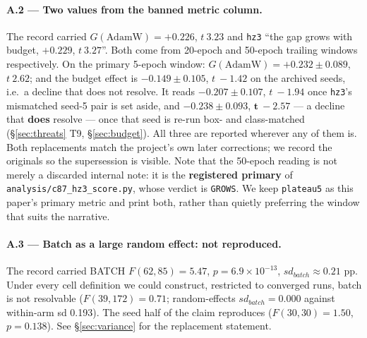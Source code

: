\documentclass[10pt,letterpaper]{article}
\newcommand{\Gstat}{G}                         %
\newcommand{\plateau}{\texttt{plateau5}}
\newcommand{\arm}[1]{\texttt{#1}}
\begin{document}
\paragraph{A.2 --- Two values from the banned metric column.}
The record carried $\Gstat(\text{AdamW}) = +0.226$, $t\ 3.23$ and \arm{hz3} ``the gap grows with
budget, $+0.229$, $t\ 3.27$''. Both come from 20-epoch and 50-epoch trailing windows respectively.
On the primary 5-epoch window: $\Gstat(\text{AdamW}) = \mathbf{+0.232 \pm 0.089}$, $t\ 2.62$; and
the budget effect is $\mathbf{-0.149 \pm 0.105}$, $t\ -1.42$ on the archived seeds, i.e.\ a
decline that does not resolve. It reads $\mathbf{-0.207 \pm 0.107}$, $t\ -1.94$ once \arm{hz3}'s
mismatched seed-5 pair is set aside, and $\mathbf{-0.238 \pm 0.093}$, $\mathbf{t\ -2.57}$ --- a
decline that \textbf{does} resolve --- once that seed is re-run box- and class-matched
(\S\ref{sec:threats} T9, \S\ref{sec:budget}). All three are reported wherever any of them is. Both replacements match the project's own later
corrections; we record the originals so the supersession is visible. Note that the 50-epoch reading
is not merely a discarded internal note: it is the \textbf{registered primary} of
\texttt{analysis/c87\_hz3\_score.py}, whose verdict is \texttt{GROWS}. We keep \plateau{} as this
paper's primary metric and print both, rather than quietly preferring the window that suits the
narrative.

\paragraph{A.3 --- Batch as a large random effect: not reproduced.}
The record carried BATCH $F(62,85) = 5.47$, $p = 6.9\times10^{-13}$, $sd_{batch} \approx 0.21$ pp.
Under every cell definition we could construct, restricted to converged runs, batch is not
resolvable ($F(39,172) = 0.71$; random-effects $sd_{batch} = 0.000$ against within-arm sd 0.193).
The seed half of the claim reproduces ($F(30,30) = 1.50$, $p = 0.138$). See \S\ref{sec:variance}
for the replacement statement.
\end{document}
